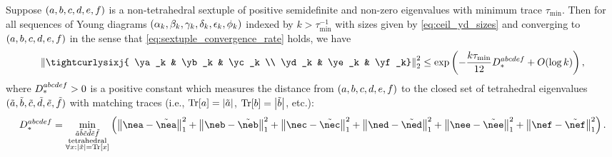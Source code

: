 \documentclass[notitlepage, 10pt]{article}
\begin{document}
\begin{cor}
    Suppose $(a, b, c, d, e, f)$ is a non-tetrahedral sextuple of positive semidefinite and non-zero eigenvalues with minimum trace $\tau_{\min}$.
    Then for all sequences of Young diagrams $(\alpha_k, \beta_k, \gamma_k, \delta_k, \epsilon_k, \phi_k)$ indexed by $k > \tau_{\min}^{-1}$ with sizes given by \cref{eq:ceil_yd_sizes} and converging to $(a,b,c,d,e,f)$ in the sense that \cref{eq:sextuple_convergence_rate} holds, we have
    \begin{equation}
        \label{eq:seq_ud_sixj_upper_bound}
        \norm{\tightcurlysixj{ \ya_k & \yb_k & \yc_k \\ \yd_k &  \ye_k &  \yf_k}}_{2}^{2}
        \leq \exp\left(- \frac{k \tau_{\min}}{12} D_{*}^{\ea\eb\ec\ed\ee\ef} + O(\log k)\right),
    \end{equation}
    where $D_{*}^{abcdef} > 0$ is a positive constant which measures the distance from $(a, b, c, d, e, f)$ to the closed set of tetrahedral eigenvalues $(\tilde {a}, \tilde {b}, \tilde {c}, \tilde {d}, \tilde {e}, \tilde {f})$ with matching traces (i.e., ${\operatorname{Tr}[a]}=\left|\tilde {a}\right|$, ${\operatorname{Tr}[b]}=\left|\tilde {b}\right|$, etc.):
    \begin{equation}
        D_{*}^{\ea\eb\ec\ed\ee\ef} =
        \min_{\substack{\tilde \ea \tilde \eb \tilde \ec\tilde\ed \tilde \ee \tilde \ef\\\mathrm{tetrahedral}\\\forall \ex : \abs{\tilde \ex}={\tex}}}
        \left(
        \norm{\nea - \tilde{\nea}}_{1}^{2} +
        \norm{\neb - \tilde{\neb}}_{1}^{2} +
        \norm{\nec - \tilde{\nec}}_{1}^{2} +
        \norm{\ned - \tilde{\ned}}_{1}^{2} +
        \norm{\nee - \tilde{\nee}}_{1}^{2} +
        \norm{\nef - \tilde{\nef}}_{1}^{2}
        \right)
        .
    \end{equation}
\end{cor}
\end{document}
